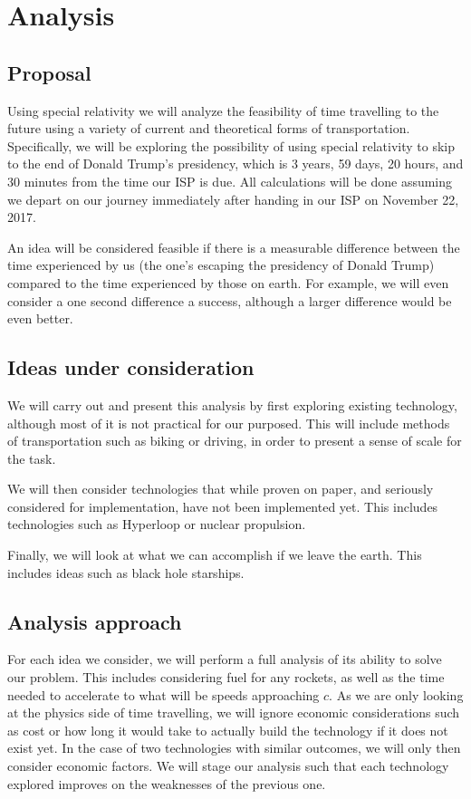 \chapter{Analysis}
	\section{Proposal}
		Using special relativity we will analyze the feasibility of time travelling to the future using a variety of current and theoretical forms of transportation. Specifically, we will be exploring the possibility of using special relativity to skip to the end of Donald Trump's presidency, which is 3 years, 59 days, 20 hours, and 30 minutes from the time our ISP is due. All calculations will be done assuming we depart on our journey immediately after handing in our ISP on November 22, 2017.
		
		An idea will be considered feasible if there is a measurable difference between the time experienced by us (the one's escaping the presidency of Donald Trump) compared to the time experienced by those on earth. For example, we will even consider a one second difference a success, although a larger difference would be even better.
	\section{Ideas under consideration}
		We will carry out and present this analysis by first exploring existing technology, although most of it is not practical for our purposed. This will include methods of transportation such as biking or driving, in order to present a sense of scale for the task.
		
		We will then consider technologies that while proven on paper, and seriously considered for implementation, have not been implemented yet. This includes technologies such as Hyperloop or nuclear propulsion.

		Finally, we will look at what we can accomplish if we leave the earth. This includes ideas such as black hole starships.
	\section{Analysis approach}
		For each idea we consider, we will perform a full analysis of its ability to solve our problem. This includes considering fuel for any rockets, as well as the time needed to accelerate to what will be speeds approaching $c$. As we are only looking at the physics side of time travelling, we will ignore economic considerations such as cost or how long it would take to actually build the technology if it does not exist yet. In the case of two technologies with similar outcomes, we will only then consider economic factors. We will stage our analysis such that each technology explored improves on the weaknesses of the previous one.
